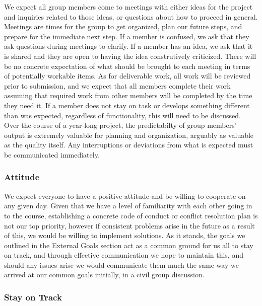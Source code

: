 \documentclass{article}
\begin{document}
We expect all group members come to meetings with either ideas for the project and inquiries related to those ideas, or questions about how to proceed in general. Meetings are times for the group to get organized, plan our future steps, and prepare for the immediate next step. If a member is confused, we ask that they ask questions during meetings to clarify. If a member has an idea, we ask that it is shared and they are open to having the idea construtively criticized. There will be no concrete expectation of what should be brought to each meeting in terms of potentially workable items. As for deliverable work, all work will be reviewed prior to submission, and we expect that all members complete their work assuming that required work from other members will be completed by the time they need it. If a member does not stay on task or develops something different than was expected, regardless of functionality, this will need to be discussed. Over the course of a year-long project, the predictabilty of group members' output is extremely valuable for planning and organization, arguably as valuable as the quality itself. Any interruptions or deviations from what is expected must be communicated immediately.

\subsubsection*{Attitude}

We expect everyone to have a positive attitude and be willing to cooperate on any given day. Given that we have a level of familiarity with each other going in to the course, establishing a concrete code of conduct or conflict resolution plan is not our top priority, however if consistent problems arise in the future as a result of this, we would be willing to implement solutions. As it stands, the goals we outlined in the External Goals section act as a common ground for us all to stay on track, and through effective communication we hope to maintain this, and should any issues arise we would communicate them much the same way we arrived at our common goals initially, in a civil group discussion.

\subsubsection*{Stay on Track}
\end{document}
